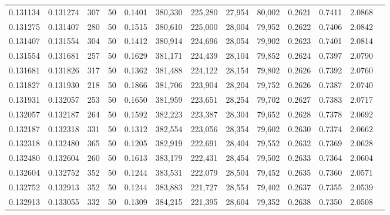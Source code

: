\begin{tabular}{rrrrrrrrrrrrr}
0.131134 & 0.131274 &   307 &  50 &                                     0.1401 & 380,330 & 225,280 &  27,954 &  80,002 & 0.2621 & 0.7411 & 2.0868 \\
0.131275 & 0.131407 &   280 &  50 &                                     0.1515 & 380,610 & 225,000 &  28,004 &  79,952 & 0.2622 & 0.7406 & 2.0842 \\
0.131407 & 0.131554 &   304 &  50 &                                     0.1412 & 380,914 & 224,696 &  28,054 &  79,902 & 0.2623 & 0.7401 & 2.0814 \\
0.131554 & 0.131681 &   257 &  50 &                                     0.1629 & 381,171 & 224,439 &  28,104 &  79,852 & 0.2624 & 0.7397 & 2.0790 \\
0.131681 & 0.131826 &   317 &  50 &                                     0.1362 & 381,488 & 224,122 &  28,154 &  79,802 & 0.2626 & 0.7392 & 2.0760 \\
0.131827 & 0.131930 &   218 &  50 &                                     0.1866 & 381,706 & 223,904 &  28,204 &  79,752 & 0.2626 & 0.7387 & 2.0740 \\
0.131931 & 0.132057 &   253 &  50 &                                     0.1650 & 381,959 & 223,651 &  28,254 &  79,702 & 0.2627 & 0.7383 & 2.0717 \\
0.132057 & 0.132187 &   264 &  50 &                                     0.1592 & 382,223 & 223,387 &  28,304 &  79,652 & 0.2628 & 0.7378 & 2.0692 \\
0.132187 & 0.132318 &   331 &  50 &                                     0.1312 & 382,554 & 223,056 &  28,354 &  79,602 & 0.2630 & 0.7374 & 2.0662 \\
0.132318 & 0.132480 &   365 &  50 &                                     0.1205 & 382,919 & 222,691 &  28,404 &  79,552 & 0.2632 & 0.7369 & 2.0628 \\
0.132480 & 0.132604 &   260 &  50 &                                     0.1613 & 383,179 & 222,431 &  28,454 &  79,502 & 0.2633 & 0.7364 & 2.0604 \\
0.132604 & 0.132752 &   352 &  50 &                                     0.1244 & 383,531 & 222,079 &  28,504 &  79,452 & 0.2635 & 0.7360 & 2.0571 \\
0.132752 & 0.132913 &   352 &  50 &                                     0.1244 & 383,883 & 221,727 &  28,554 &  79,402 & 0.2637 & 0.7355 & 2.0539 \\
0.132913 & 0.133055 &   332 &  50 &                                     0.1309 & 384,215 & 221,395 &  28,604 &  79,352 & 0.2638 & 0.7350 & 2.0508 \\

\end{tabular}
